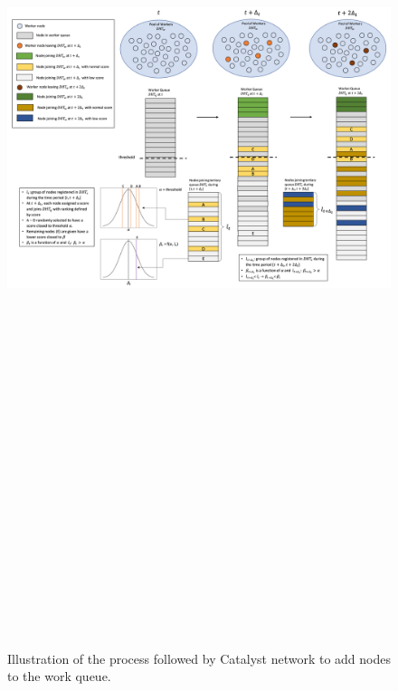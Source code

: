\newpage
\begin{landscape}
\begin{figure}
\includegraphics[width=22cm,height=42cm,keepaspectratio]{Figures/Work_Queue_Management}
\caption{\label{fig:NSM}Illustration of the process followed by Catalyst network to add nodes to the work queue.}
\end{figure}
\end{landscape}

